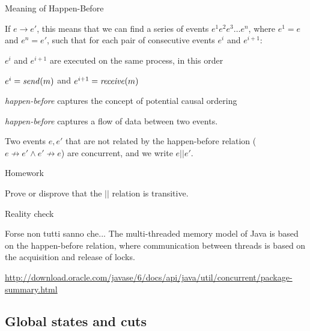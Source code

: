 \begin{frame}{Meaning of Happen-Before}

If $e \rightarrow e'$, this means that we can find a series of events
$e^1 e^2 e^3 \ldots e^n$, where $e^1 = e$ and $e^n = e'$, such that
for each pair of consecutive events $e^i$ and $e^{i+1}$:
\BE
\item $e^i$ and $e^{i+1}$ are executed on the same process, in this order
\item $e^i = \mathit{send}(m)$ and $e^{i+1} = \mathit{receive}(m)$
\EE

\bigskip
{}
\BIL
\item {\em happen-before} captures the concept of \alert{potential causal ordering}
\item {\em happen-before} captures a flow of data between two events.
\item Two events $e,e'$ that are not related by the happen-before relation 
  ($e \not\rightarrow e' \wedge e' \not\rightarrow e$) are \alert{concurrent},
  and we write $e || e'$.
\EIL

\end{frame}

\begin{frame}{Homework}


Prove or disprove that the $||$ relation is transitive.

\end{frame}



\begin{frame}{Reality check}

\begin{block}{Forse non tutti sanno che...}
The multi-threaded memory model of Java is based on the happen-before relation,
where communication between threads is based on the acquisition and release of
locks.

\bigskip
\url{http://download.oracle.com/javase/6/docs/api/java/util/concurrent/package-summary.html}
\end{block}

	
\end{frame}


\subsection{Global states and cuts}

